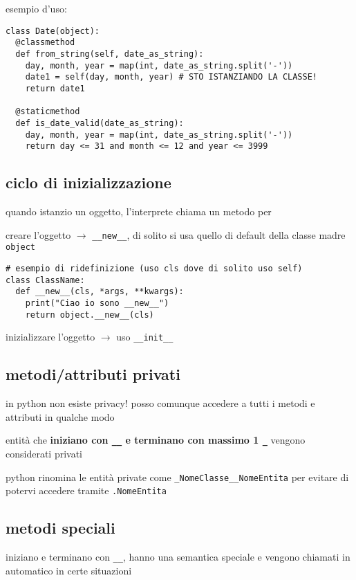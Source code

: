 esempio d'uso:

\begin{verbatim}
class Date(object):
  @classmethod
  def from_string(self, date_as_string):
    day, month, year = map(int, date_as_string.split('-'))
    date1 = self(day, month, year) # STO ISTANZIANDO LA CLASSE!
    return date1

  @staticmethod
  def is_date_valid(date_as_string):
    day, month, year = map(int, date_as_string.split('-'))
    return day <= 31 and month <= 12 and year <= 3999
\end{verbatim}

\subsection{ciclo di inizializzazione}

quando istanzio un oggetto, l'interprete chiama un metodo per

creare l'oggetto $\rightarrow$ \texttt{__new__}, di solito si usa quello di default della classe madre \texttt{object}

\begin{verbatim}
# esempio di ridefinizione (uso cls dove di solito uso self)
class ClassName:
  def __new__(cls, *args, **kwargs):
    print("Ciao io sono __new__")
    return object.__new__(cls)
\end{verbatim}

inizializzare l'oggetto $\rightarrow$ uso \texttt{__init__}

\subsection{metodi/attributi privati}

in python non esiste privacy! posso comunque accedere a tutti i metodi e attributi in qualche modo

entit\`a che \textbf{iniziano con \texttt{__} e terminano con massimo 1 \texttt{_}} vengono considerati privati

python rinomina le entit\`a private come \texttt{_NomeClasse__NomeEntita} per evitare di potervi accedere tramite \texttt{.NomeEntita}

\subsection{metodi speciali}

iniziano e terminano con \texttt{__}, hanno una semantica speciale e vengono chiamati in automatico in certe situazioni

